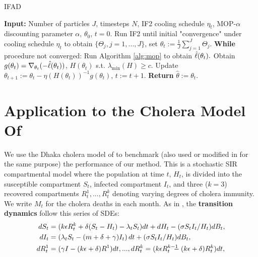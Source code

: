 \documentclass[9pt,twocolumn,twoside]{pnas-new}
\begin{document}
\begin{algorithm}[H]
	\caption{IFAD}
    \label{alg:ifad}
	    \textbf{Input:} Number of particles $J$, timesteps $N$, IF2 cooling schedule $\eta_t$, MOP-$\alpha$ discounting parameter $\alpha$, $\theta_0$, $t=0.$\newline
        Run IF2 until initial "convergence" under cooling schedule $\eta_t$ to obtain $\{\Theta_j, j=1,...,J\}$, set $\theta_t := \frac{1}{J}\sum_{j=1}^J \Theta_j.$\newline
		\textbf{While} procedure not converged: \newline
		\hspace*{4mm} Run Algorithm \ref{alg:mop} to obtain $\hat{\ell}(\theta_t).$ \newline
		\hspace*{4mm} Obtain $g(\theta_t) = \nabla_{\theta_t} (-\hat{\ell}(\theta_t))$, $H(\theta_t)$ s.t. $\lambda_{\min}(H) \geq c$. \newline
		\hspace*{4mm} Update $\theta_{t+1} := \theta_t - \eta (H(\theta_t))^{-1} g(\theta_t)$, $t:=t+1.$ \newline
		\textbf{Return} $\hat{\theta} := \theta_t.$
\end{algorithm}

\section{Application to the Cholera Model Of \cite{king08}}


We use the Dhaka cholera model of \cite{king08} to benchmark (also used or modified in \cite{ionides15, wood16, wycoff24} for the same purpose) the performance of our method. This is a stochastic SIR compartmental model where the population at time $t$, $H_t$, is divided into the susceptible compartment $S_t$, infected compartment $I_t$, and three ($k=3$) recovered compartments $R^1_t, ..., R^k_t$ denoting varying degrees of cholera immunity. We write $M_t$ for the cholera deaths in each month. As in \cite{king08, ionides15}, the \textbf{transition dynamics} follow this series of SDEs:
\vspace*{-1mm}
\begin{align*}
    d S_t&=(k \epsilon R^k_t+\delta(S_t-H_t)-\lambda_t S_t) d t+d H_t-({\sigma S_t I_t}/{H_t}) d B_t, \\
    d I_t&=\left(\lambda_t S_t-(m+\delta+\gamma) I_t\right) d t+({\sigma S_t I_t}/{H_t}) d B_t, \\
    d R^1_t&=(\gamma I-(k \epsilon+\delta) R^1) d t,..., 
    d R^k_t=(k \epsilon R^{k-1}_t\hspace{-3mm}-(k \epsilon+\delta) R^k_t) d t,
    \vspace*{-2mm}
\end{align*}
\end{document}
